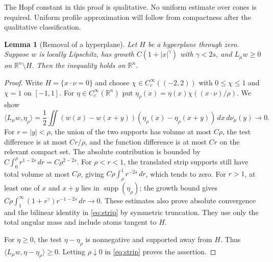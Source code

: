 \documentclass[11pt]{article}
\numberwithin{equation}{section}
\newtheorem{lemma}[theorem]{Lemma}
\theoremstyle{remark}
\newcommand{\R}{\mathbb R}
\newcommand{\ip}[2]{\langle #1,#2\rangle}
\newcommand{\abs}[1]{\lvert #1\rvert}
\newcommand{\supp}{\operatorname{supp}}
\newcommand{\dd}{\,d}
\begin{document}
The Hopf constant in this proof is qualitative. No uniform estimate over cones is required. Uniform profile approximation will follow from compactness after the qualitative classification.

\begin{lemma}[Removal of a hyperplane]\label{lem:removal}
Let $H$ be a hyperplane through zero. Suppose $w$ is locally Lipschitz, has growth $C(1+\abs{x}^{\gamma})$ with $\gamma<2s$, and $L_\mu w\ge0$ on $\R^n\setminus H$. Then the inequality holds on $\R^n$.
\end{lemma}
\begin{proof}
Write $H=\{x\cdot\nu=0\}$ and choose $\chi\in C_c^\infty((-2,2))$ with $0\le\chi\le1$ and $\chi=1$ on $[-1,1]$. For $\eta\in C_c^\infty(\R^n)$ put
$\eta_\rho(x)=\eta(x)\chi((x\cdot\nu)/\rho)$. We show
\begin{equation}\label{eq:strip}
 \ip{L_\mu w}{\eta_\rho}
 =\frac12\iint (w(x)-w(x+y))
 (\eta_\rho(x)-\eta_\rho(x+y))\dd x\dd\nu_\mu(y)\longrightarrow0.
\end{equation}
For $r=\abs y<\rho$, the union of the two supports has volume at most $C\rho$, the test difference is at most $Cr/\rho$, and the function difference is at most $Cr$ on the relevant compact set. The absolute contribution is bounded by
$C\int_0^\rho r^{1-2s}\dd r=C\rho^{2-2s}$. For $\rho<r<1$, the translated strip supports still have total volume at most $C\rho$, giving
$C\rho\int_\rho^1r^{-2s}\dd r$, which tends to zero. For $r>1$, at least one of $x$ and $x+y$ lies in $\supp(\eta_\rho)$; the growth bound gives
$C\rho\int_1^\infty(1+r^\gamma)r^{-1-2s}\dd r\to0$.
These estimates also prove absolute convergence and the bilinear identity in \eqref{eq:strip} by symmetric truncation. They use only the total angular mass and include atoms tangent to $H$.

For $\eta\ge0$, the test $\eta-\eta_\rho$ is nonnegative and supported away from $H$. Thus $\ip{L_\mu w}{\eta-\eta_\rho}\ge0$. Letting $\rho\downarrow0$ in \eqref{eq:strip} proves the assertion.
\end{proof}
\end{document}
